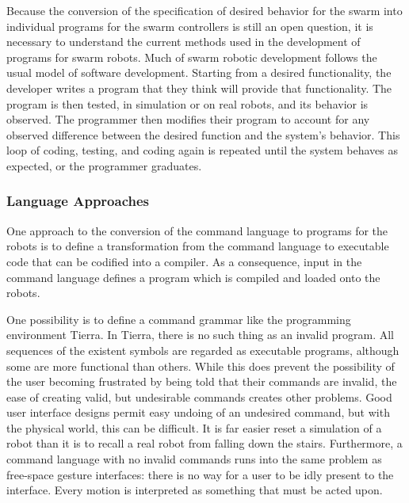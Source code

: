 \documentclass[]{article}
\begin{document}
Because the conversion of the specification of desired behavior for the swarm into individual programs for the swarm controllers is still an open question, it is necessary to understand the current methods used in the development of programs for swarm robots. 
Much of swarm robotic development follows the usual model of software development. 
Starting from a desired functionality, the developer writes a program that they think will provide that functionality.
The program is then tested, in simulation or on real robots, and its behavior is observed. 
The programmer then modifies their program to account for any observed difference between the desired function and the system's behavior. 
This loop of coding, testing, and coding again is repeated until the system behaves as expected, or the programmer graduates. 

\subsubsection {Language Approaches}

One approach to the conversion of the command language to programs for the robots is to define a transformation from the command language to executable code that can be codified into a compiler. 
As a consequence, input in the command language defines a program which is compiled and loaded onto the robots. 

One possibility is to define a command grammar like the programming environment Tierra. \cite{ray1991approach}
In Tierra, there is no such thing as an invalid program. 
All sequences of the existent symbols are regarded as executable programs, although some are more functional than others. 
While this does prevent the possibility of the user becoming frustrated by being told that their commands are invalid, the ease of creating valid, but undesirable commands creates other problems. 
Good user interface designs permit easy undoing of an undesired command, but with the physical world, this can be difficult. 
It is far easier reset a simulation of a robot than it is to recall a real robot from falling down the stairs. 
Furthermore, a command language with no invalid commands runs into the same problem as free-space gesture interfaces: there is no way for a user to be idly present to the interface.
Every motion is interpreted as something that must be acted upon. 
\end{document}
